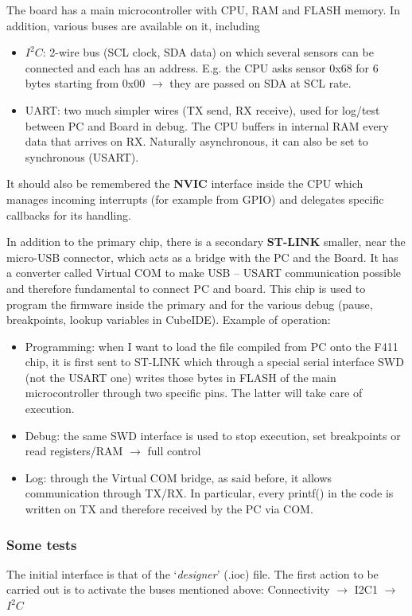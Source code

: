 The board has a main microcontroller with CPU, RAM and FLASH memory. In addition, various buses are available on it, including
\begin{itemize}
    \item $I^2C$: 2-wire bus (SCL clock, SDA data) on which several sensors can be connected and each has an address. E.g. the CPU asks sensor 0x68 for 6 bytes starting from 0x00 $\rightarrow$ they are passed on SDA at SCL rate.
    \item UART: two much simpler wires (TX send, RX receive), used for log/test between PC and Board in debug. The CPU buffers in internal RAM every data that arrives on RX. Naturally asynchronous, it can also be set to synchronous (USART).
\end{itemize}
It should also be remembered the \textbf{NVIC} interface inside the CPU which manages incoming interrupts (for example from GPIO) and delegates specific callbacks for its handling.

In addition to the primary chip, there is a secondary \textbf{ST-LINK} smaller, near the micro-USB connector, which acts as a bridge with the PC and the Board. It has a converter called Virtual COM to make USB – USART communication possible and therefore fundamental to connect PC and board. This chip is used to program the firmware inside the primary and for the various debug (pause, breakpoints, lookup variables in CubeIDE). Example of operation:
\begin{itemize}
    \item Programming: when I want to load the file compiled from PC onto the F411 chip, it is first sent to ST-LINK which through a special serial interface SWD (not the USART one) writes those bytes in FLASH of the main microcontroller through two specific pins. The latter will take care of execution.
    \item Debug: the same SWD interface is used to stop execution, set breakpoints or read registers/RAM $\rightarrow$ full control
    \item Log: through the Virtual COM bridge, as said before, it allows communication through TX/RX. In particular, every printf() in the code is written on TX and therefore received by the PC via COM.
\end{itemize}

\subsubsection{Some tests}
The initial interface is that of the ‘\textit{designer}’ (.ioc) file. The first action to be carried out is to activate the buses mentioned above: Connectivity $\rightarrow$ I2C1 $\rightarrow$ $I^2C$ 

